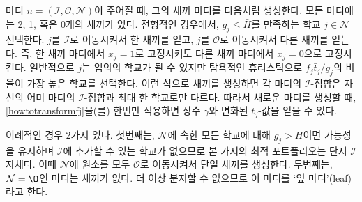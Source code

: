 \documentclass[11pt]{article} %
\newif\ifen
\theoremstyle{definition}
\theoremstyle{definition}
\begin{document}
\ifen 
Given a node $n  = (\mathcal{I}, \mathcal{O}, \mathcal{N})$, its children are generated as follows. Every node has two, one, or zero children. In the typical case, we select a school $j \in \mathcal{N}$ for which $g_j \leq \bar H$ and generate one child by moving $j$ to $\mathcal{I}$, and another child by moving $j$ it to $\mathcal{O}$. Equivalently, we set $x_j = 1$ in one child and $x_j = 0$ in the other. In principle, any school can be chosen for $j$, but as a greedy heuristic, we choose the school for which the ratio $f_j \bar t_j / g_j$ is highest.  Notice that this method of generating children ensures that each node's $\mathcal{I}$-set differs from its parent's by at most a single school, so the constant $\gamma$ and transformed $\bar t_j$-values for the new node can be obtained by a single application of \eqref{howtotransformfj}. 
\else
마디  $n  = (\mathcal{I}, \mathcal{O}, \mathcal{N})$이 주어질 때, 그의 새끼 마디를 다음처럼 생성한다. 모든 마디에는 2, 1, 혹은 0개의 새끼가 있다. 전형적인 경우에서, $g_j \leq \bar H$를 만족하는 학교 $j \in \mathcal{N}$ 선택한다. $j$를 $\mathcal{I}$로 이동시켜서 한 새끼를 얻고, $j$를 $\mathcal{O}$로 이동시켜서 다른 새끼를 얻는다. 즉, 한 새끼 마디에서 $x_j = 1$로 고정시키도 다른 새끼 마디에서 $x_j = 0$으로 고정시킨다. 일반적으로 $j$는 임의의 학교가 될 수 있지만 탐욕적인 휴리스틱으로 $f_j \bar t_j / g_j$의 비율이 가장 높은 학교를 선택한다. 이런 식으로 새끼를 생성하면 각 마디의 $\mathcal{I}$-집합은 자신의 어미 마디의 $\mathcal{I}$-집합과 최대 한 학교로만 다르다. 따라서 새로운 마디를 생성할 때, \eqref{howtotransformfj}을(를) 한번만 적용하면 상수 $\gamma$와 변화된 $\bar t_j$-값을 얻을 수 있다.
\fi

\ifen
There are two atypical cases. First, if every school in $\mathcal{N}$ has $g_j > \bar H$, then there is no school that can be added to $\mathcal{I}$ in a feasible portfolio, and the optimal portfolio on this branch is $\mathcal{I}$ itself. In this case, we generate only one child by moving all the schools from $\mathcal{N}$ to $\mathcal{O}$. Second, if $\mathcal{N} = \O$, then the node has zero children, and as no further branching is possible, the node is called a \emph{leaf.}
\else
이례적인 경우 2가지 있다. 첫번째는, $\mathcal{N}$에 속한 모든 학교에 대해 $g_j > \bar H$이면 가능성을 유지하며 $\mathcal{I}$에 추가할 수 있는 학교가 없으므로 본 가지의 최적 포트폴리오는 단지 $\mathcal{I}$ 자체다. 이때 $\mathcal{N}$에 원소를 모두 $\mathcal{O}$로 이동시켜서 단일 새끼를 생성한다. 두번째는, $\mathcal{N} = \O$인 마디는 새끼가 없다. 더 이상 분지할 수 없으므로 이 마디를 `잎 마디'(leaf)라고 한다.
\fi
\end{document}
